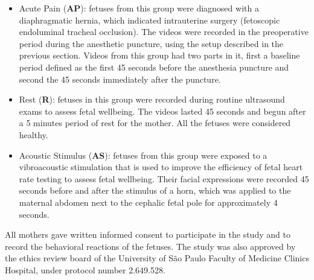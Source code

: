 \begin{itemize}
    \item Acute Pain (\textbf{AP}): fetuses from this group were diagnosed with a diaphragmatic hernia, which indicated intrauterine surgery (fetoscopic endoluminal tracheal occlusion). The videos were recorded in the preoperative period during the anesthetic puncture, using the setup described in the previous section. Videos from this group had two parts in it, first a baseline period defined as the first 45 seconds before the anesthesia puncture and second the 45 seconds immediately after the puncture. 
    
    \item Rest (\textbf{R}): fetuses in this group were recorded during routine ultrasound exams to assess fetal wellbeing. The videos lasted 45 seconds and begun after a 5 minutes period of rest for the mother. All the fetuses were considered healthy.
    
    \item Acoustic Stimulus (\textbf{AS}): fetuses from this group were exposed to a vibroacoustic stimulation that is used to improve the efficiency of fetal heart rate testing to assess fetal wellbeing. Their facial expressions were recorded 45 seconds before and after the stimulus of a horn, which was applied to the maternal abdomen next to the cephalic fetal pole for approximately 4 seconds.
\end{itemize}

All mothers gave written informed consent to participate in the study and to record the behavioral reactions of the fetuses. The study was also approved by the ethics review board of the University of São Paulo Faculty of Medicine Clinics Hospital, under protocol number 2.649.528.
